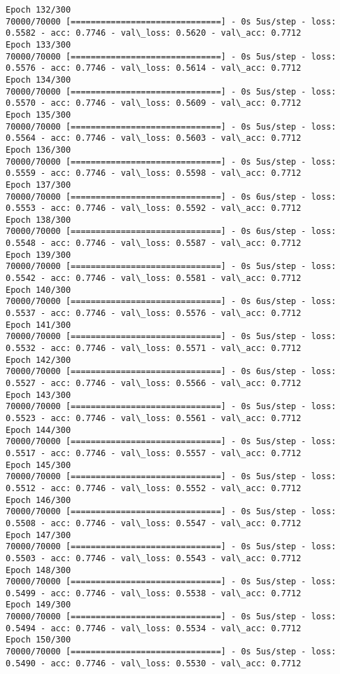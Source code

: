 \documentclass[11pt]{article}
\begin{document}
\begin{Verbatim}[commandchars=\\\{\}]
Epoch 132/300
70000/70000 [==============================] - 0s 5us/step - loss: 0.5582 - acc: 0.7746 - val\_loss: 0.5620 - val\_acc: 0.7712
Epoch 133/300
70000/70000 [==============================] - 0s 5us/step - loss: 0.5576 - acc: 0.7746 - val\_loss: 0.5614 - val\_acc: 0.7712
Epoch 134/300
70000/70000 [==============================] - 0s 5us/step - loss: 0.5570 - acc: 0.7746 - val\_loss: 0.5609 - val\_acc: 0.7712
Epoch 135/300
70000/70000 [==============================] - 0s 5us/step - loss: 0.5564 - acc: 0.7746 - val\_loss: 0.5603 - val\_acc: 0.7712
Epoch 136/300
70000/70000 [==============================] - 0s 5us/step - loss: 0.5559 - acc: 0.7746 - val\_loss: 0.5598 - val\_acc: 0.7712
Epoch 137/300
70000/70000 [==============================] - 0s 6us/step - loss: 0.5553 - acc: 0.7746 - val\_loss: 0.5592 - val\_acc: 0.7712
Epoch 138/300
70000/70000 [==============================] - 0s 6us/step - loss: 0.5548 - acc: 0.7746 - val\_loss: 0.5587 - val\_acc: 0.7712
Epoch 139/300
70000/70000 [==============================] - 0s 5us/step - loss: 0.5542 - acc: 0.7746 - val\_loss: 0.5581 - val\_acc: 0.7712
Epoch 140/300
70000/70000 [==============================] - 0s 6us/step - loss: 0.5537 - acc: 0.7746 - val\_loss: 0.5576 - val\_acc: 0.7712
Epoch 141/300
70000/70000 [==============================] - 0s 5us/step - loss: 0.5532 - acc: 0.7746 - val\_loss: 0.5571 - val\_acc: 0.7712
Epoch 142/300
70000/70000 [==============================] - 0s 6us/step - loss: 0.5527 - acc: 0.7746 - val\_loss: 0.5566 - val\_acc: 0.7712
Epoch 143/300
70000/70000 [==============================] - 0s 5us/step - loss: 0.5523 - acc: 0.7746 - val\_loss: 0.5561 - val\_acc: 0.7712
Epoch 144/300
70000/70000 [==============================] - 0s 5us/step - loss: 0.5517 - acc: 0.7746 - val\_loss: 0.5557 - val\_acc: 0.7712
Epoch 145/300
70000/70000 [==============================] - 0s 5us/step - loss: 0.5512 - acc: 0.7746 - val\_loss: 0.5552 - val\_acc: 0.7712
Epoch 146/300
70000/70000 [==============================] - 0s 5us/step - loss: 0.5508 - acc: 0.7746 - val\_loss: 0.5547 - val\_acc: 0.7712
Epoch 147/300
70000/70000 [==============================] - 0s 5us/step - loss: 0.5503 - acc: 0.7746 - val\_loss: 0.5543 - val\_acc: 0.7712
Epoch 148/300
70000/70000 [==============================] - 0s 5us/step - loss: 0.5499 - acc: 0.7746 - val\_loss: 0.5538 - val\_acc: 0.7712
Epoch 149/300
70000/70000 [==============================] - 0s 5us/step - loss: 0.5494 - acc: 0.7746 - val\_loss: 0.5534 - val\_acc: 0.7712
Epoch 150/300
70000/70000 [==============================] - 0s 5us/step - loss: 0.5490 - acc: 0.7746 - val\_loss: 0.5530 - val\_acc: 0.7712

\end{Verbatim}
\end{document}
